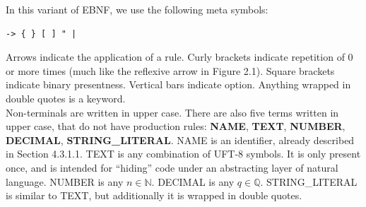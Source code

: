 In this variant of EBNF, we use the following meta symbols:

\begin{lstlisting}
-> { } [ ] " |
\end{lstlisting}

Arrows indicate the application of a rule. Curly brackets indicate repetition of 0 or more times (much like the reflexive arrow in Figure 2.1). Square brackets indicate binary presentness. Vertical bars indicate option. Anything wrapped in double quotes is a keyword. \hfill \\

Non-terminals are written in upper case. There are also five terms written in upper case, that do not have production rules: \textbf{NAME}, \textbf{TEXT}, \textbf{NUMBER}, \textbf{DECIMAL}, \textbf{STRING\_LITERAL}. NAME is an identifier, already described in Section 4.3.1.1. TEXT is any combination of UFT-8 symbols. It is only present once, and is intended for ``hiding'' code under an abstracting layer of natural language. NUMBER is any $n \in \mathbb{N}$. DECIMAL is any $q \in \mathbb{Q}$. STRING\_LITERAL is similar to TEXT, but additionally it is wrapped in double quotes. \hfill \\


